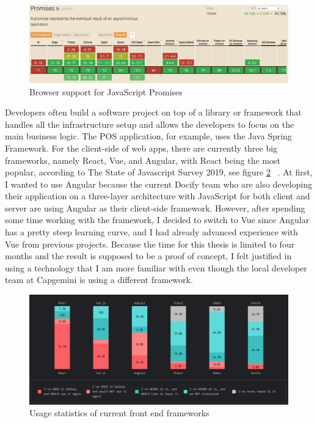 \begin{figure}[ht]
  \centering
  \includegraphics[width=0.8\linewidth]{assets/caniuse-promises.png}
  \caption{Browser support for JavaScript Promises}
  \label{fig:caniuse-promises}
\end{figure}

Developers often build a software project on top of a library or framework that handles all the infrastructure setup and allows the developers to focus on the main business logic. The POS application, for example, uses the Java Spring Framework. For the client-side of web apps, there are currently three big frameworks, namely React, Vue, and Angular, with React being the most popular, according to The State of Javascript Survey 2019, see figure \ref{fig:frontend-framework-usage} ~\cite{stateofjs.2019}. At first, I wanted to use Angular because the current Docify team who are also developing their application on a three-layer architecture with JavaScript for both client and server are using Angular as their client-side framework. However, after spending some time working with the framework, I decided to switch to Vue since Angular has a pretty steep learning curve, and I had already advanced experience with Vue from previous projects. Because the time for this thesis is limited to four months and the result is supposed to be a proof of concept, I felt justified in using a technology that I am more familiar with even though the local developer team at Capgemini is using a different framework.

\begin{figure}[ht]
  \centering
  \includegraphics[width=0.8\linewidth]{assets/frontend-framework-usage.png}
  \caption{Usage statistics of current front end frameworks}
  \label{fig:frontend-framework-usage}
\end{figure}

